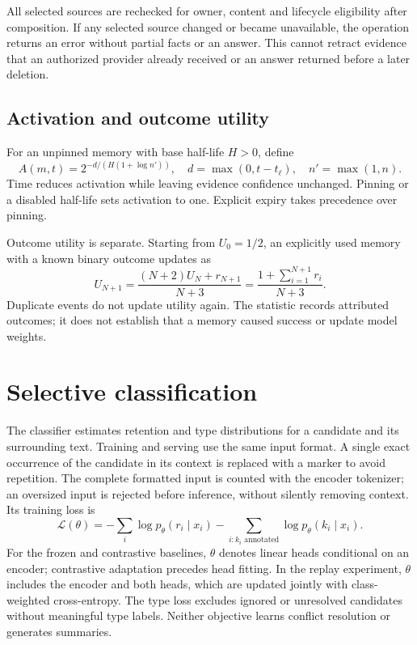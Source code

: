 \documentclass[11pt]{article}
\begin{document}
All selected sources are rechecked for owner, content and lifecycle eligibility after composition. If any selected source changed or became unavailable, the operation returns an error without partial facts or an answer. This cannot retract evidence that an authorized provider already received or an answer returned before a later deletion.

\subsection{Activation and outcome utility}
For an unpinned memory with base half-life $H>0$, define
\[
 A(m,t)=2^{-d/(H(1+\log n'))},\quad
 d=\max(0,t-t_\ell),\quad n'=\max(1,n).
\]
Time reduces activation while leaving evidence confidence unchanged. Pinning or a disabled half-life sets activation to one. Explicit expiry takes precedence over pinning.

Outcome utility is separate. Starting from $U_0=1/2$, an explicitly used memory with a known binary outcome updates as
\[
 U_{N+1}=\frac{(N+2)U_N+r_{N+1}}{N+3}
        =\frac{1+\sum_{i=1}^{N+1}r_i}{N+3}.
\]
Duplicate events do not update utility again. The statistic records attributed outcomes; it does not establish that a memory caused success or update model weights.

\section{Selective classification}
The classifier estimates retention and type distributions for a candidate and its surrounding text. Training and serving use the same input format. A single exact occurrence of the candidate in its context is replaced with a marker to avoid repetition. The complete formatted input is counted with the encoder tokenizer; an oversized input is rejected before inference, without silently removing context. Its training loss is
\[
 \mathcal{L}(\theta)=
 -\sum_i\log p_\theta(r_i\mid x_i)
 -\sum_{i:k_i\text{ annotated}}\log p_\theta(k_i\mid x_i).
\]
For the frozen and contrastive baselines, $\theta$ denotes linear heads conditional on an encoder; contrastive adaptation precedes head fitting. In the replay experiment, $\theta$ includes the encoder and both heads, which are updated jointly with class-weighted cross-entropy. The type loss excludes ignored or unresolved candidates without meaningful type labels. Neither objective learns conflict resolution or generates summaries.
\end{document}

